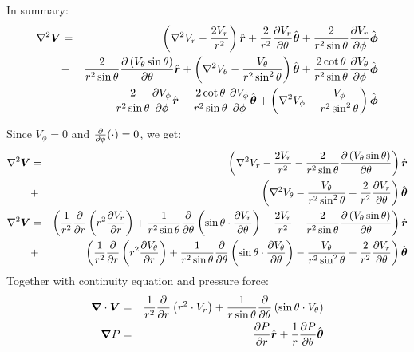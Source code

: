 \documentclass[11pt]{article}
\begin{document}
In summary:
\begin{eqnarray}
\nabla^2 \boldsymbol{V} &=& \left(\nabla^2 V_r - \frac{2V_r}{r^2}\right)\hat{\boldsymbol{r}}
+ \frac{2}{r^2}\frac{\partial V_r}{\partial \theta} \hat{\boldsymbol{\theta}} + \frac{2}{r^2 \sin\theta}\frac{\partial V_r}{\partial \phi} \hat{\boldsymbol{\phi}} \\
&-&
\frac{2}{r^2 \sin\theta} \frac{\partial \left(V_\theta \sin\theta \right)}{\partial \theta}\hat{\boldsymbol{r}}
+ \left(\nabla^2 V_\theta - \frac{V_\theta}{r^2 \sin^2\theta}\right) \hat{\boldsymbol{\theta}}
+ \frac{2 \cot\theta}{r^2 \sin\theta} \frac{\partial V_\theta}{\partial \phi} \hat{\boldsymbol{\phi}} \\
&-&
\frac{2}{r^2 \sin\theta}\frac{\partial V_\phi}{\partial \phi}\hat{\boldsymbol{r}} -
\frac{2 \cot\theta}{r^2 \sin\theta}\frac{\partial V_\phi}{\partial \phi}\hat{\boldsymbol{\theta}}
+ \left(\nabla^2 V_\phi - \frac{V_\phi}{r^2 \sin^2\theta}\right)\hat{\boldsymbol{\phi}}
\end{eqnarray}

Since $V_\phi = 0$ and $\frac{\partial }{\partial \phi}(\cdot) = 0$, we get:
\begin{eqnarray}
\nabla^2 \boldsymbol{V} &=& \left(\nabla^2 V_r - \frac{2V_r}{r^2} - \frac{2}{r^2 \sin\theta} \frac{\partial \left(V_\theta \sin\theta \right)}{\partial \theta}\right)\hat{\boldsymbol{r}}
\\
&+&
\left(\nabla^2 V_\theta - \frac{V_\theta}{r^2 \sin^2\theta} + \frac{2}{r^2}\frac{\partial V_r}{\partial \theta}\right) \hat{\boldsymbol{\theta}}
\\
\nabla^2 \boldsymbol{V} &=& \left(
\frac{1}{r^2}\frac{\partial }{\partial r}\left( r^2 \frac{\partial V_r}{\partial r} \right) + \frac{1}{r^2 \sin\theta} \frac{\partial }{\partial \theta} \left( \sin\theta \cdot \frac{\partial V_r}{\partial \theta}\right)
 - \frac{2V_r}{r^2} - \frac{2}{r^2 \sin\theta} \frac{\partial \left(V_\theta \sin\theta \right)}{\partial \theta}\right)\hat{\boldsymbol{r}} \\
&+& \left(
\frac{1}{r^2}\frac{\partial }{\partial r}\left( r^2 \frac{\partial V_\theta}{\partial r} \right) + \frac{1}{r^2 \sin\theta} \frac{\partial }{\partial \theta} \left( \sin\theta \cdot \frac{\partial V_\theta}{\partial \theta}\right)
 - \frac{V_\theta}{r^2 \sin^2\theta} + \frac{2}{r^2}\frac{\partial V_r}{\partial \theta}\right) \hat{\boldsymbol{\theta}}
\end{eqnarray}
Together with continuity equation and pressure force:
\begin{eqnarray}
\boldsymbol{\nabla} \cdot \boldsymbol{V} &=& \frac{1}{r^2}\frac{\partial}{\partial r} \left( r^2 \cdot V_r\right)
  + \frac{1}{r \sin\theta} \frac{\partial}{\partial \theta} \left( \sin\theta \cdot V_\theta\right)
\\
\boldsymbol{\nabla} P &=& \frac{\partial P}{\partial r} \hat{\boldsymbol{r}} + \frac{1}{r}\frac{\partial P}{\partial \theta} \hat{\boldsymbol{\theta}}
\end{eqnarray}
\end{document}
